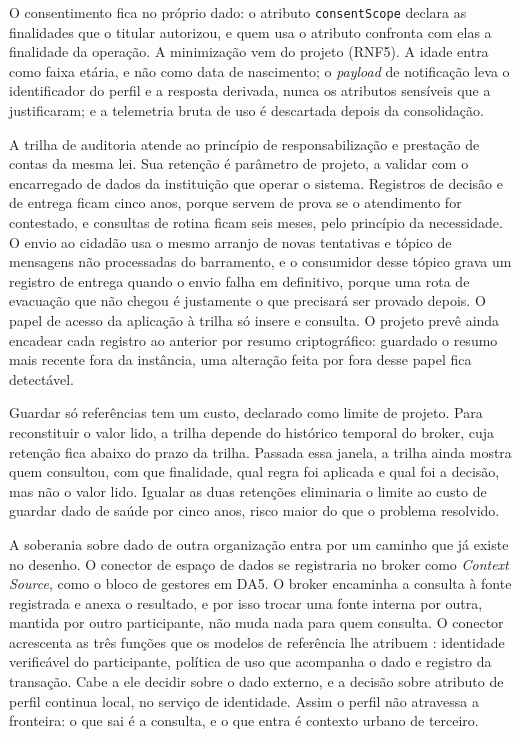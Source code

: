O consentimento fica no próprio dado: o atributo \texttt{consentScope} declara as finalidades que o titular autorizou, e quem usa o atributo confronta com elas a finalidade da operação. A minimização vem do projeto (RNF5). A idade entra como faixa etária, e não como data de nascimento; o \textit{payload} de notificação leva o identificador do perfil e a resposta derivada, nunca os atributos sensíveis que a justificaram; e a telemetria bruta de uso é descartada depois da consolidação.

A trilha de auditoria atende ao princípio de responsabilização e prestação de contas da mesma lei. Sua retenção é parâmetro de projeto, a validar com o encarregado de dados da instituição que operar o sistema. Registros de decisão e de entrega ficam cinco anos, porque servem de prova se o atendimento for contestado, e consultas de rotina ficam seis meses, pelo princípio da necessidade. O envio ao cidadão usa o mesmo arranjo de novas tentativas e tópico de mensagens não processadas do barramento, e o consumidor desse tópico grava um registro de entrega quando o envio falha em definitivo, porque uma rota de evacuação que não chegou é justamente o que precisará ser provado depois. O papel de acesso da aplicação à trilha só insere e consulta. O projeto prevê ainda encadear cada registro ao anterior por resumo criptográfico: guardado o resumo mais recente fora da instância, uma alteração feita por fora desse papel fica detectável.

Guardar só referências tem um custo, declarado como limite de projeto. Para reconstituir o valor lido, a trilha depende do histórico temporal do broker, cuja retenção fica abaixo do prazo da trilha. Passada essa janela, a trilha ainda mostra quem consultou, com que finalidade, qual regra foi aplicada e qual foi a decisão, mas não o valor lido. Igualar as duas retenções eliminaria o limite ao custo de guardar dado de saúde por cinco anos, risco maior do que o problema resolvido.

A soberania sobre dado de outra organização entra por um caminho que já existe no desenho. O conector de espaço de dados se registraria no broker como \textit{Context Source}, como o bloco de gestores em DA5. O broker encaminha a consulta à fonte registrada e anexa o resultado, e por isso trocar uma fonte interna por outra, mantida por outro participante, não muda nada para quem consulta. O conector acrescenta as três funções que os modelos de referência lhe atribuem \cite{idsa2022ram,gaiax2022architecture}: identidade verificável do participante, política de uso que acompanha o dado e registro da transação. Cabe a ele decidir sobre o dado externo, e a decisão sobre atributo de perfil continua local, no serviço de identidade. Assim o perfil não atravessa a fronteira: o que sai é a consulta, e o que entra é contexto urbano de terceiro.

